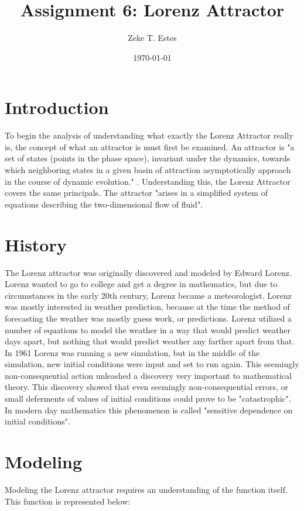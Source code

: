 \documentclass[10pt]{article}
\title{Assignment 6: Lorenz Attractor}
\author{Zeke T. Estes}
\date{\today}
\begin{document}
\maketitle

\section{Introduction}
To begin the analysis of understanding what exactly the Lorenz Attractor really is, the concept of what an attractor is must first be examined. An attractor is "a set of states (points in the phase space), invariant under the dynamics, towards which neighboring states in a given basin of attraction asymptotically approach in the course of dynamic evolution." \cite{WolframA}. Understanding this, the Lorenz Attractor covers the same principals. The attractor "arises in a simplified system of equations describing the two-dimensional flow of fluid". \cite{WolframLA} 

\section{History}
The Lorenz attractor was originally discovered and modeled by Edward Lorenz. Lorenz wanted to go to college and get a degree in mathematics, but due to circumstances in the early 20th century, Lorenz became a meteorologist. Lorenz was mostly interested in weather prediction, because at the time the method of forecasting the weather was mostly guess work, or predictions. Lorenz utilized a number of equations to model the weather in a way that would predict weather days apart, but nothing that would predict weather any farther apart from that. In 1961 Lorenz was running a new simulation, but in the middle of the simulation, new initial conditions were input and set to run again. This seemingly non-consequential action unleashed a discovery very important to mathematical theory. This discovery showed that even seemingly non-consequential errors, or small deferments of values of initial conditions could prove to be "catastrophic". In modern day mathematics this phenomenon is called "sensitive dependence on initial conditions". \cite{History}

\section{Modeling}
Modeling the Lorenz attractor requires an understanding of the function itself. This function is represented below:
\end{document}
